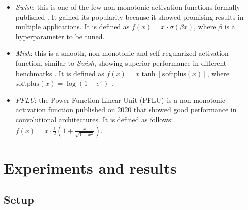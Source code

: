 \begin{itemize}
	\item \textit{Swish}: this is one of the few non-monotonic activation functions formally published \autocite{ramachandran2018}. It gained its popularity because it showed promising results in multiple applications. It is defined as $f(x) = x \cdot \sigma(\beta x)$, where $\beta$ is a hyperparameter to be tuned.
	\item \textit{Mish}: this is a smooth, non-monotonic and self-regularized activation function, similar to \textit{Swish}, showing superior performance in different benchmarks \autocite{misra2019mish}. It is defined as $f(x) = x \tanh \left[\text{softplus} (x)\right]$, where $\text{softplus} (x) = \log(1+e^x)$ \autocite{dugas2001}.
	\item \textit{PFLU}: the Power Function Linear Unit (PFLU) is a non-monotonic activation function published on 2020 that showed good performance in convolutional architectures. It is defined as follows: $f(x) = x \cdot \frac{1}{2} \left( 1 + \frac{x}{\sqrt{1+x^2}} \right)$.

\end{itemize}

\section{Experiments and results} \label{sec:modulus_experiments}
\subsection{Setup}

